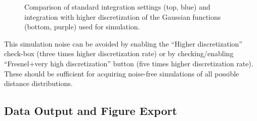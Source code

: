 \documentclass[pdftex,bezier,german,a4,twoside, headexclude,12pt,nochapterprefix, titlepage]{extarticle}
\newcommand{\figspace}{\hspace{0.5cm}}
\begin{document}
\begin{figure}[!htb]
     \figspace
    \caption{Comparison of standard integration settings (top, blue) and integration with higher discretization of the Gaussian
    functions (bottom, purple) used for simulation.
    }
\label{Integration_mehtods_comparison}
\end{figure} 

This simulation noise can be avoided by enabling the ``Higher discretization'' check-box (three times higher discretization rate) or by checking/enabling ``Fresnel+very high discretization'' button (five times higher discretization rate). These should be sufficient for acquiring noise-free simulations of all possible distance distributions.

\newpage

\subsection{Data Output and Figure Export}
\end{document}
